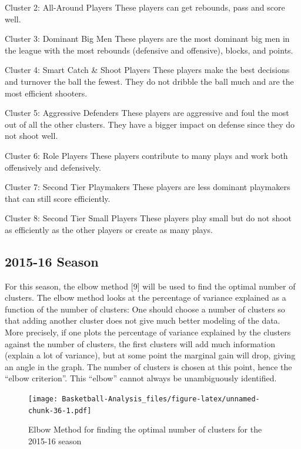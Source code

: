 \documentclass[]{book}
\begin{document}
Cluster 2: All-Around Players
These players can get rebounds, pass and score well.

Cluster 3: Dominant Big Men
These players are the most dominant big men in the league with the most rebounds (defensive and offensive), blocks, and points.

Cluster 4: Smart Catch \& Shoot Players
These players make the best decisions and turnover the ball the fewest. They do not dribble the ball much and are the most efficient shooters.

Cluster 5: Aggressive Defenders
These players are aggressive and foul the most out of all the other clusters. They have a bigger impact on defense since they do not shoot well.

Cluster 6: Role Players
These players contribute to many plays and work both offensively and defensively.

Cluster 7: Second Tier Playmakers
These players are less dominant playmakers that can still score efficiently.

Cluster 8: Second Tier Small Players
These players play small but do not shoot as efficiently as the other players or create as many plays.

\hypertarget{season}{%
\subsection{2015-16 Season}\label{season}}

For this season, the elbow method {[}9{]} will be used to find the optimal number of clusters. The elbow method looks at the percentage of variance explained as a function of the number of clusters: One should choose a number of clusters so that adding another cluster does not give much better modeling of the data. More precisely, if one plots the percentage of variance explained by the clusters against the number of clusters, the first clusters will add much information (explain a lot of variance), but at some point the marginal gain will drop, giving an angle in the graph. The number of clusters is chosen at this point, hence the ``elbow criterion''. This ``elbow'' cannot always be unambiguously identified.

\begin{figure}
\centering
\texttt{[image: Basketball-Analysis\_files/figure-latex/unnamed-chunk-36-1.pdf]}
\caption{\label{fig:unnamed-chunk-36}Elbow Method for finding the optimal number of clusters for the 2015-16 season}
\end{figure}
\end{document}
